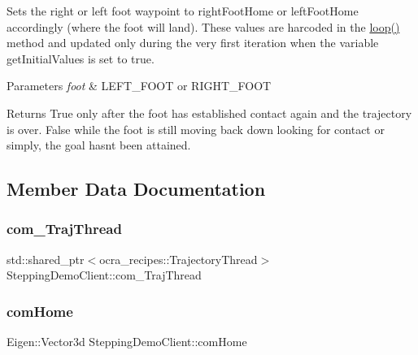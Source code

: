 Sets the right or left foot waypoint to right\+Foot\+Home or left\+Foot\+Home accordingly (where the foot will land). These values are harcoded in the \hyperlink{classSteppingDemoClient_a37dba4764b5849cf33c395cd0d4b0eb5}{loop()} method and updated only during the very first iteration when the variable get\+Initial\+Values is set to true.


\begin{DoxyParams}{Parameters}
{\em foot} & L\+E\+F\+T\+\_\+\+F\+O\+OT or R\+I\+G\+H\+T\+\_\+\+F\+O\+OT\\
\hline
\end{DoxyParams}
\begin{DoxyReturn}{Returns}
True only after the foot has established contact again and the trajectory is over. False while the foot is still moving back down looking for contact or simply, the goal hasn\textquotesingle{}t been attained. 
\end{DoxyReturn}


\subsection{Member Data Documentation}
\hypertarget{classSteppingDemoClient_a9f3d1cdc49cc26a10f9b8fb0d0c68cab}{}\label{classSteppingDemoClient_a9f3d1cdc49cc26a10f9b8fb0d0c68cab} 
\subsubsection{\texorpdfstring{com\+\_\+\+Traj\+Thread}{com\_TrajThread}}
{\footnotesize\ttfamily std\+::shared\+\_\+ptr$<$ocra\+\_\+recipes\+::\+Trajectory\+Thread$>$ Stepping\+Demo\+Client\+::com\+\_\+\+Traj\+Thread\hspace{0.3cm}{\ttfamily [private]}}

\hypertarget{classSteppingDemoClient_aa018c1f2734d63f962be512461c9e010}{}\label{classSteppingDemoClient_aa018c1f2734d63f962be512461c9e010} 
\subsubsection{\texorpdfstring{com\+Home}{comHome}}
{\footnotesize\ttfamily Eigen\+::\+Vector3d Stepping\+Demo\+Client\+::com\+Home\hspace{0.3cm}{\ttfamily [private]}}

